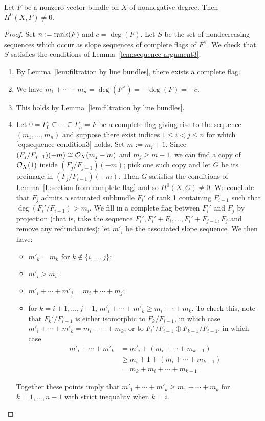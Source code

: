 \begin{lemma} \label{L:section from nonnegative degree}
Let $F$ be a nonzero vector bundle on $X$ of nonnegative degree.
Then $H^0(X, F) \neq 0$.
\end{lemma}
\begin{proof}
Set $n := \operatorname{rank}(F)$ and $c = \deg(F)$.
Let $S$ be the set of nondecreasing sequences which occur as slope sequences of complete flags of $F^\vee$.
We check that $S$ satisfies the conditions of Lemma~\ref{lem:sequence argument3}.
\begin{enumerate}
\item[(a)] By Lemma~\ref{lem:filtration by line bundles}, there exists a complete flag.
\item[(b)] We have $m_1 + \cdots + m_n = \deg(F^\vee) = -\deg(F) = -c$.
\item[(c)] This holds by Lemma~\ref{lem:filtration by line bundles}.
\item[(d)] 
Let $0 = F_0 \subseteq \cdots \subseteq F_n = F$ be a complete flag giving rise to the sequence
$(m_1,\dots,m_n)$ and suppose there exist indices $1 \leq i < j \leq n$ for which \eqref{eq:sequence condition3} holds. Set $m := m_i + 1$. Since $(F_j/F_{j-1})(-m) \cong \mathcal{O}_X(m_j-m)$ and $m_j \geq m + 1$, we can find a copy of $\mathcal{O}_X(1)$ inside $(F_j/F_{j-1})(-m)$; pick one such copy and let $G$ be its preimage in $(F_j/F_{i-1})(-m)$. Then $G$ satisfies the conditions of Lemma~\ref{L:section from complete flag} and so $H^0(X, G) \neq 0$. We conclude that $F_j$ admits a saturated subbundle $F_{i}'$
of rank 1 containing $F_{i-1}$ such that $\deg(F_{i}'/F_{i-1}) > m_i$.
We fill in a complete flag between $F_{i}'$ and $F_j$ by projection
(that is, take the sequence $F_i', F_i' + F_i, \dots, F_i'+F_{j-1}, F_j$
and remove any redundancies); let $m'_i$ be the associated slope sequence.
We then have:
\begin{itemize}
\item $m'_k = m_k$ for $k \notin \{i,\dots,j\}$;
\item $m'_i > m_i$;
\item $m'_i + \cdots + m'_j = m_i + \cdots + m_j$;
\item for $k=i+1,\dots,j-1$, $m'_i + \cdots + m'_k \geq m_i + \cdot + m_k$.
To check this, note that $F_k'/F_{i-1}$ is either isomorphic to $F_k/F_{i-1}$,
in which case $m'_i + \cdots + m'_k = m_i + \cdots + m_k$,
or to $F_{i}'/F_{i-1} \oplus F_{k-1}/F_{i-1}$,
in which case 
\begin{align*}
m'_i + \cdots + m'_k &= m'_i + (m_i + \cdots + m_{k-1})  \\
&\geq m_i + 1 + (m_i + \cdots + m_{k-1}) \\
&= m_k + m_i + \cdots + m_{k-1}.
\end{align*}
\end{itemize}
Together these points imply that $m'_1 + \cdots + m'_k \geq m_1 + \cdots + m_k$ for $k=1,\dots,n-1$
with strict inequality when $k=i$.
\end{enumerate}


\end{proof}
